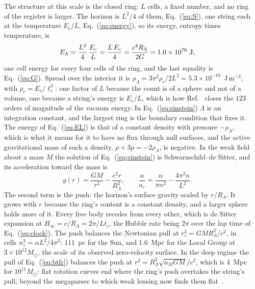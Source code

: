 \documentclass[aps,prd,twocolumn,superscriptaddress,nofootinbib,showkeys]{revtex4-2}
\newcommand{\lc}{\ell_c}
\newcommand{\tc}{t_c}
\newcommand{\Ec}{E_c}
\newcommand{\ac}{a_c}
\newcommand{\RL}{R_\Lambda}
\begin{document}
The structure at this scale is the closed ring: $L$ cells, a fixed number, and no ring of the register is larger. The horizon is $L^2/4$ of them, Eq.~(\ref{eq:S}), one string each at the temperature $\Ec/L$, Eq.~(\ref{eq:energy}), so its energy, entropy times temperature, is
\begin{equation}
E_\Lambda = \frac{L^2}{4}\,\frac{\Ec}{L} = \frac{L\,\Ec}{4} = \frac{c^4\RL}{2G} = 1.0\times10^{70}~{\rm J},
\label{eq:EL}
\end{equation}
one cell energy for every four cells of the ring, and the last equality is Eq.~(\ref{eq:G}). Spread over the interior it is $\rho_\Lambda = 3\pi^2\rho_c/2L^2 = 5.3\times10^{-10}$~J\,m$^{-3}$, with $\rho_c = \Ec/\lc^3$: one factor of $L$ because the count is of a sphere and not of a volume, one because a string's energy is $\Ec/L$, which is how Ref.~\cite{korytko2026b} closes the $123$ orders of magnitude of the vacuum energy. In Eq.~(\ref{eq:einstein}) $\Lambda$ is an integration constant, and the largest ring is the boundary condition that fixes it. The energy of Eq.~(\ref{eq:EL}) is that of a constant density with pressure $-\rho_\Lambda$, which is what it means for it to have no flux through null surfaces, and the active gravitational mass of such a density, $\rho + 3p = -2\rho_\Lambda$, is negative. In the weak field about a mass $M$ the solution of Eq.~(\ref{eq:einstein}) is Schwarzschild--de Sitter, and its acceleration toward the mass is
\begin{equation}
g(r) = \frac{GM}{r^2} - \frac{c^2 r}{\RL^2}, \qquad \frac{a}{\ac} = \frac{\alpha}{\pi n^2} - \frac{4\pi^2 n}{L^2} .
\label{eq:push}
\end{equation}
The second term is the push: the horizon's surface gravity scaled by $r/\RL$. It grows with $r$ because the ring's content is a constant density, and a larger sphere holds more of it. Every free body recedes from every other, which is de Sitter expansion at $H_\infty = c/\RL = 2\pi/L\tc$, the Hubble rate being $2\pi$ over the lap time of Eq.~(\ref{eq:clock}). The push balances the Newtonian pull at $r_z^3 = GM\RL^2/c^2$, in cells $n_z^3 = \alpha L^2/4\pi^3$: $111$~pc for the Sun, and $1.6$~Mpc for the Local Group at $3\times10^{12}M_\odot$, the scale of its observed zero-velocity surface. In the deep regime the pull of Eq.~(\ref{eq:btfr}) balances the push at $r^2 = \RL^2\sqrt{a_MGM}/c^2$, which is $4$~Mpc for $10^{11}M_\odot$: flat rotation curves end where the ring's push overtakes the string's pull, beyond the megaparsec to which weak lensing now finds them flat~\cite{mistele2024}.
\end{document}
